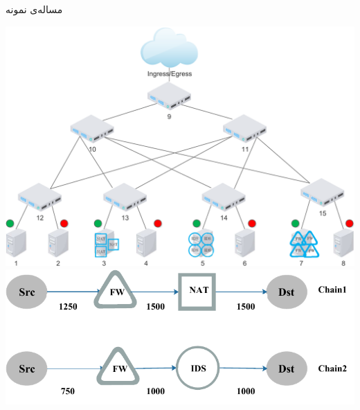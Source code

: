 \documentclass{beamer}
\begin{document}
\begin{persian}
\begin{frame}{مساله‌ی نمونه}
\begin{table}[h!]
    \end{table}
    \begin{center}
        \includegraphics[scale=0.3]{./images/topology.pdf}
        \vspace{1mm}
        \includegraphics[scale=0.3]{./images/chains.pdf}
    \end{center}
\end{frame}
\begin{frame}{}

\end{frame}
\end{persian}
\end{document}
